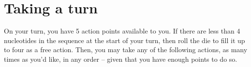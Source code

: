 \documentclass[a4paper,11pt,oneside]{memoir}
\begin{document}
%
%
%
%
%
%    
%
%
%    
%
%
%
%
%
%
%
%
%
%


\section*{Taking a turn}

On your turn, you have 5 action points available to you.
If there are less than 4 nucleotides in the sequence at the start of your turn, then roll the die to fill it up to four as a free action.
Then, you may take any of the following actions, as many times as you'd like, in any order -- given that you have enough points to do so.
\end{document}
